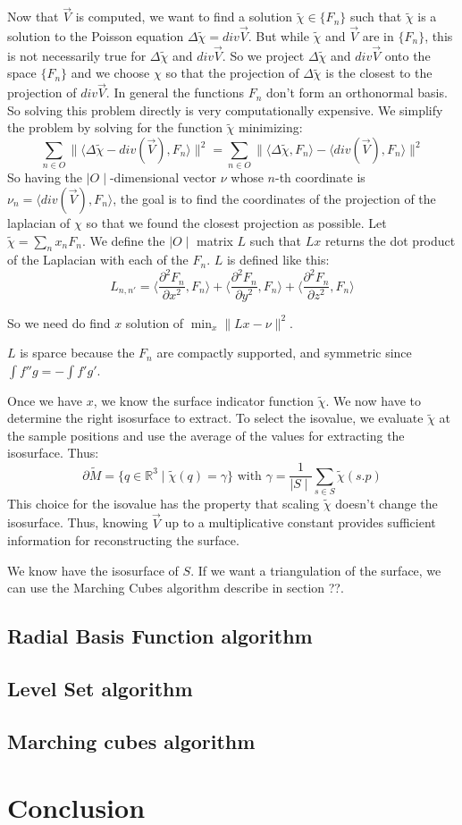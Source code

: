 \documentclass[a4paper]{article}
\begin{document}
Now that $\vec{V}$ is computed, we want to find a solution $\tilde{\chi} \in \{F_n\}$ such that $\tilde{\chi}$ is a solution to the Poisson equation $\Delta\tilde{\chi} = div{\vec{V}}$. But while $\tilde{\chi}$ and $\vec{V}$ are in $\{F_n\}$, this is not necessarily true for $\Delta\tilde{\chi}$ and $div{\vec{V}}$. So we project $\Delta\tilde{\chi}$ and $div{\vec{V}}$ onto the space $\{F_n\}$ and we choose $\chi$ so that the projection of $\Delta\tilde{\chi}$ is the closest to the projection of $div{\vec{V}}$. In general the functions $F_n$ don't form an orthonormal basis. So solving this problem directly is very computationally expensive. We simplify the problem by solving for the function $\tilde{\chi}$ minimizing:
$$\sum_{n \in O}\|\langle\Delta\tilde{\chi}-div(\vec{V}),F_n\rangle\|^2 = \sum_{n \in O}\|\langle\Delta\tilde{\chi},F_n\rangle - \langle div(\vec{V}), F_n\rangle\|^2$$
So having the $\mid O \mid$-dimensional vector $\nu$ whose $n$-th coordinate is $\nu_n = \langle div(\vec{V}), F_n\rangle$, the goal is to find the coordinates of the projection of the laplacian of $\chi$ so that we found the closest projection as possible. Let $\tilde{\chi} = \sum_n x_n F_n$. We define the $\mid O \mid$ matrix $L$ such that $Lx$ returns the dot product of the Laplacian with each of the $F_n$. $L$ is defined like this:
$$L_{n,n'} = \langle\frac{\partial^2F_n}{\partial x^2}, F_n\rangle + \langle\frac{\partial^2F_n}{\partial y^2}, F_n\rangle + \langle\frac{\partial^2F_n}{\partial z^2}, F_n\rangle$$ 

So we need do find $x$ solution of $\min_{x}\|Lx - \nu\|^2$.

$L$ is sparce because the $F_n$ are compactly supported, and symmetric since $\int f''g = -\int f'g'$.

Once we have $x$, we know the surface indicator function $\tilde{\chi}$. We now have to determine the right isosurface to extract. To select the isovalue, we evaluate $\tilde{\chi}$ at the sample positions and use the average of the values for extracting the isosurface. Thus:
$$\partial\tilde{M} = \{q \in \mathbb{R}^3 \mid \tilde{\chi}(q) = \gamma\} \text{ with } \gamma = \frac{1}{\mid S\mid}\sum_{s \in S}\tilde{\chi}(s.p)$$
This choice for the isovalue has the property that scaling $\tilde{\chi}$ doesn't change the isosurface. Thus, knowing $\vec{V}$ up to a multiplicative constant provides sufficient information for reconstructing the surface.

We know have the isosurface of $S$. If we want a triangulation of the surface, we can use the Marching Cubes algorithm describe in section ??.

\subsection{Radial Basis Function algorithm}

\subsection{Level Set algorithm}

\subsection{Marching cubes algorithm}


\section*{Conclusion}
\end{document}
